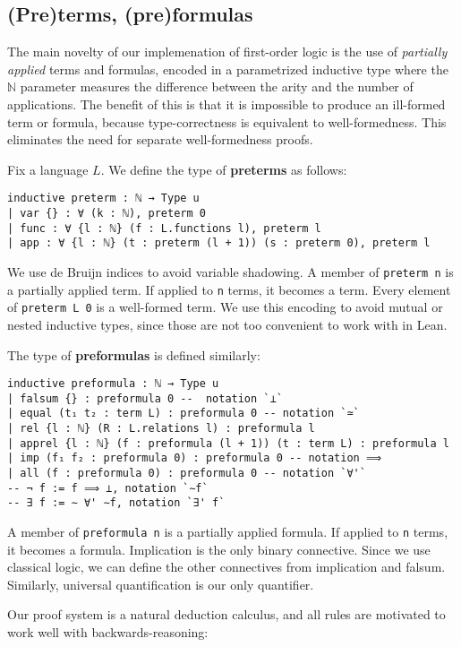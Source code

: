 \documentclass[a4paper,USenglish,cleveref, autoref]{lipics-v2019}
\newcommand{\lil}{\lstinline}
\newcommand{\N}{\mathbb{N}}
\theoremstyle{theorem}
\theoremstyle{definition}
\begin{document}
\subsection{(Pre)terms, (pre)formulas}
The main novelty of our implemenation of first-order logic is the use of \emph{partially applied} terms and formulas, encoded in a parametrized inductive type where the $\N$ parameter measures the difference between the arity and the number of applications. The benefit of this is that it is impossible to produce an ill-formed term or formula, because type-correctness is equivalent to well-formedness. This eliminates the need for separate well-formedness proofs.

Fix a language $L$. We define the type of \textbf{preterms} as follows:
\begin{lstlisting}
inductive preterm : ℕ → Type u
| var {} : ∀ (k : ℕ), preterm 0
| func : ∀ {l : ℕ} (f : L.functions l), preterm l
| app : ∀ {l : ℕ} (t : preterm (l + 1)) (s : preterm 0), preterm l
\end{lstlisting}
We use de Bruijn indices to avoid variable shadowing. A member of \lil{preterm n} is a partially applied term. If applied to \lil{n} terms, it becomes a term. Every element of \lil{preterm L 0} is a well-formed term. We use this encoding to avoid mutual or nested inductive types, since those are not too convenient to work with in Lean.

The type of \textbf{preformulas} is defined similarly:
\begin{lstlisting}
inductive preformula : ℕ → Type u
| falsum {} : preformula 0 --  notation `⊥`
| equal (t₁ t₂ : term L) : preformula 0 -- notation `≃`
| rel {l : ℕ} (R : L.relations l) : preformula l
| apprel {l : ℕ} (f : preformula (l + 1)) (t : term L) : preformula l
| imp (f₁ f₂ : preformula 0) : preformula 0 -- notation ⟹
| all (f : preformula 0) : preformula 0 -- notation `∀'`
-- ¬ f := f ⟹ ⊥, notation `∼f`
-- ∃ f := ∼ ∀' ∼f, notation `∃' f`
\end{lstlisting}

A member of \lil{preformula n} is a partially applied formula. If applied to \lil{n} terms, it becomes a formula. Implication is the only binary connective. Since we use classical logic, we can define the other connectives from implication and falsum. Similarly, universal quantification is our only quantifier.

Our proof system is a natural deduction calculus, and %
all rules are motivated to work well with backwards-reasoning:
\end{document}
